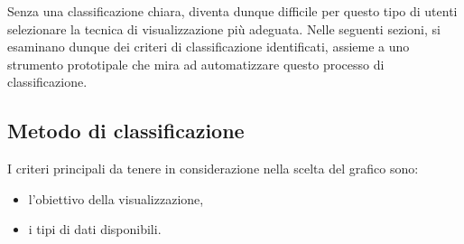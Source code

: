 Senza una classificazione chiara, diventa dunque difficile per questo tipo di utenti selezionare la tecnica di visualizzazione più adeguata.
Nelle seguenti sezioni, si esaminano dunque dei criteri di classificazione identificati, assieme a uno strumento prototipale che mira ad 
automatizzare questo processo di classificazione.


\subsection{Metodo di classificazione}
I criteri principali da tenere in considerazione nella scelta del grafico sono:
\begin{itemize}
    \item l'obiettivo della visualizzazione,
    \item i tipi di dati disponibili.
\end{itemize}

